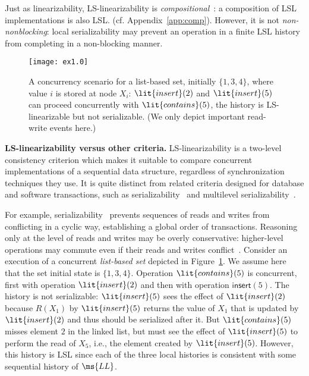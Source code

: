 \documentclass[11pt,pdftex,letterpaper]{article}
\newcommand{\LS}{LS}
\newcommand{\LL}{\ms{LL}}
\begin{document}
Just as linearizability, \LS-linearizability is
\emph{compositional}~\cite{HW90,HS08-book}: a composition of LSL 
implementations is also LSL. (cf. Appendix~\ref{app:comp}).
However, it is not \emph{non-nonblocking}: local
serializability may prevent an operation in a finite LSL
history from completing in a non-blocking manner. 

\begin{figure*}[t]
 \texttt{[image: ex1.0]}
 \caption{\small{A concurrency scenario for a list-based set, initially $\{1,3,4\}$, where value $i$ is stored at node $X_i$:
   $\lit{insert}(2)$ and  $\lit{insert}(5)$ can proceed
   concurrently with $\lit{contains}(5)$, the history is
   LS-linearizable but not serializable. (We only depict important read-write
   events here.)}}\label{fig:ex1}\end{figure*}

\vspace{1mm}\noindent\textbf{LS-linearizability versus other criteria.}
LS-linearizability is a two-level consistency criterion which makes it
suitable to compare concurrent implementations of a sequential data
structure, regardless of synchronization techniques they use.
It is quite distinct from related criteria designed for database and software
transactions, such as serializability~\cite{Pap79-serial,WV02-book} and
multilevel serializability~\cite{Wei86,WV02-book}.

For example, serializability~\cite{Pap79-serial} prevents sequences of reads and writes from conflicting in a cyclic way, 
establishing a  global order of transactions.
Reasoning only at the level of reads and writes may be overly conservative:
higher-level operations may commute even if their reads and writes conflict~\cite{Wei88}.
Consider an execution of a concurrent \emph{list-based set} depicted in 
Figure~\ref{fig:ex1}.
We assume here that the set initial state is $\{1,3,4\}$.
Operation $\lit{contains}(5)$ is concurrent, first with 
operation $\lit{insert}(2)$ and then with operation $\textsf{insert}(5)$. 
The history is not serializable:
$\lit{insert}(5)$ sees 
the effect of $\lit{insert}(2)$ because $R(X_1)$ by $\lit{insert}(5)$ returns the value
of $X_1$ that is updated by $\lit{insert}(2)$ and
thus should be serialized after it. But $\lit{contains}(5)$ misses
element $2$ in the linked list, but must see the
effect of $\lit{insert}(5)$ to perform the read of $X_5$, i.e., the element created by $\lit{insert}(5)$.  
However, this history is LSL since each of the three local histories is consistent with some
sequential history of $\LL$. 
\end{document}
